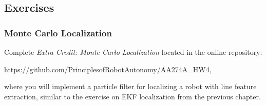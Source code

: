 \subsection{Exercises}
\subsubsection{Monte Carlo Localization}
Complete \textit{Extra Credit: Monte Carlo Localization} located in the online repository:

\vspace{\baselineskip}

\url{https://github.com/PrinciplesofRobotAutonomy/AA274A_HW4},

\vspace{\baselineskip}

where you will implement a particle filter for localizing a robot with line feature extraction, similar to the exercise on EKF localization from the previous chapter.

